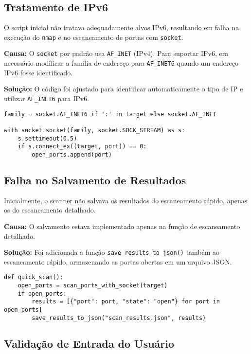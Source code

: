 \documentclass[12pt]{article}
\begin{document}
\subsection{Tratamento de IPv6}

O script inicial não tratava adequadamente alvos IPv6, resultando em falha na execução do \texttt{nmap} e no escaneamento de portas com \texttt{socket}.

\textbf{Causa:} O \texttt{socket} por padrão usa \texttt{AF\_INET} (IPv4). Para suportar IPv6, era necessário modificar a família de endereço para \texttt{AF\_INET6} quando um endereço IPv6 fosse identificado.

\textbf{Solução:} O código foi ajustado para identificar automaticamente o tipo de IP e utilizar \texttt{AF\_INET6} para IPv6.

\begin{lstlisting}
family = socket.AF_INET6 if ':' in target else socket.AF_INET

with socket.socket(family, socket.SOCK_STREAM) as s:
    s.settimeout(0.5)
    if s.connect_ex((target, port)) == 0:
        open_ports.append(port)
\end{lstlisting}

\subsection{Falha no Salvamento de Resultados}

Inicialmente, o scanner não salvava os resultados do escaneamento rápido, apenas os do escaneamento detalhado.

\textbf{Causa:} O salvamento estava implementado apenas na função de escaneamento detalhado.

\textbf{Solução:} Foi adicionada a função \texttt{save\_results\_to\_json()} também ao escaneamento rápido, armazenando as portas abertas em um arquivo JSON.

\begin{lstlisting}
def quick_scan():
    open_ports = scan_ports_with_socket(target)
    if open_ports:
        results = [{"port": port, "state": "open"} for port in open_ports]
        save_results_to_json("scan_results.json", results)
\end{lstlisting}

\subsection{Validação de Entrada do Usuário}
\end{document}

